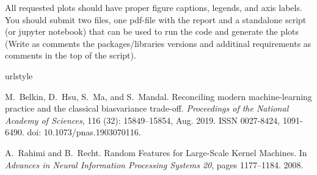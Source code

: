 \documentclass[a4paper,10pt]{article}
\begin{document}
All requested plots should have proper figure captions, legends, and axis labels. You should submit two files, one pdf-file with the report and a standalone script (or jupyter notebook) that can be used to run the code and generate the plots (Write as comments  the packages/libraries versions and additinal requirements as comments in the top of the script).

\begin{thebibliography}{2}
\providecommand{\natexlab}[1]{#1}
\providecommand{\url}[1]{\texttt{#1}}
\expandafter\ifx\csname urlstyle\endcsname\relax
  \providecommand{\doi}[1]{doi: #1}\else
  \providecommand{\doi}{doi: \begingroup \urlstyle{rm}\Url}\fi

M.~Belkin, D.~Hsu, S.~Ma, and S.~Mandal.
\newblock Reconciling modern machine-learning practice and the classical
  bias\textendash variance trade-off.
\newblock \emph{Proceedings of the National Academy of Sciences}, 116
  (32): 15849--15854, Aug. 2019.
\newblock ISSN 0027-8424, 1091-6490.
\newblock \doi{10.1073/pnas.1903070116}.

A.~Rahimi and B.~Recht.
\newblock Random {{Features}} for {{Large}}-{{Scale Kernel Machines}}.
\newblock In \emph{Advances in {{Neural Information Processing Systems}} 20},
  pages 1177--1184. 2008.

\end{thebibliography}
\end{document}
